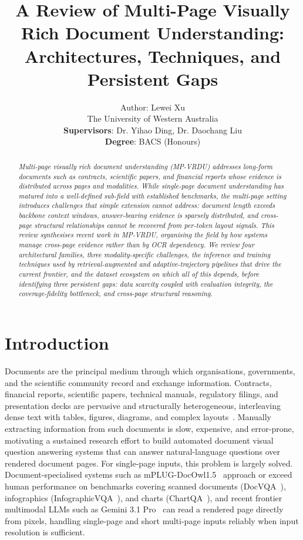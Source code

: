 \documentclass[11pt]{article}
\title{A Review of Multi-Page Visually Rich Document Understanding: Architectures, Techniques, and Persistent Gaps}
\author{Author: Lewei Xu \\
  The University of Western Australia \\
  \textbf{Supervisors}: Dr. Yihao Ding, Dr. Daochang Liu \\
  \textbf{Degree}: BACS (Honours) \\}
\date{}
\begin{document}
\maketitle

\begin{abstract}
\textit{Multi-page visually rich document understanding (MP-VRDU) addresses long-form documents such as contracts, scientific papers, and financial reports whose evidence is distributed across pages and modalities. While single-page document understanding has matured into a well-defined sub-field with established benchmarks, the multi-page setting introduces challenges that simple extension cannot address: document length exceeds backbone context windows, answer-bearing evidence is sparsely distributed, and cross-page structural relationships cannot be recovered from per-token layout signals. This review synthesises recent work in MP-VRDU, organising the field by how systems manage cross-page evidence rather than by OCR dependency. We review four architectural families, three modality-specific challenges, the inference and training techniques used by retrieval-augmented and adaptive-trajectory pipelines that drive the current frontier, and the dataset ecosystem on which all of this depends, before identifying three persistent gaps: data scarcity coupled with evaluation integrity, the coverage-fidelity bottleneck, and cross-page structural reasoning.}
\end{abstract}

\section{Introduction}
\label{sec:introduction}
Documents are the principal medium through which organisations, governments, and the scientific community record and exchange information. Contracts, financial reports, scientific papers, technical manuals, regulatory filings, and presentation decks are pervasive and structurally heterogeneous, interleaving dense text with tables, figures, diagrams, and complex layouts~\cite{tito2023hierarchical}. Manually extracting information from such documents is slow, expensive, and error-prone, motivating a sustained research effort to build automated document visual question answering systems that can answer natural-language questions over rendered document pages. For single-page inputs, this problem is largely solved. Document-specialised systems such as mPLUG-DocOwl1.5~\cite{hu2024mplugdocowl} approach or exceed human performance on benchmarks covering scanned documents (DocVQA~\cite{mathew2021docvqa}), infographics (InfographicVQA~\cite{mathew2022infographicvqa}), and charts (ChartQA~\cite{masry2022chartqa}), and recent frontier multimodal LLMs such as Gemini 3.1 Pro~\cite{google2026gemini31} can read a rendered page directly from pixels, handling single-page and short multi-page inputs reliably when input resolution is sufficient.
\end{document}
